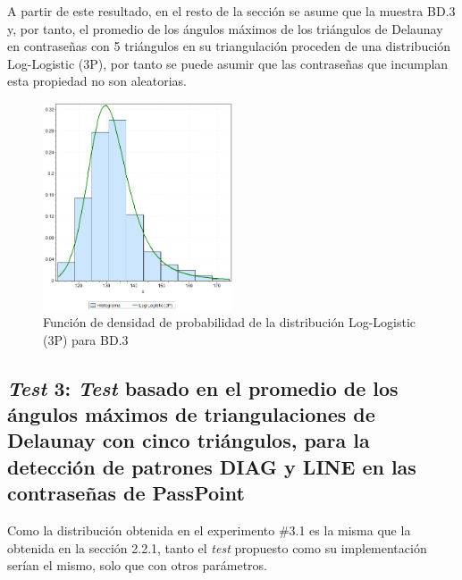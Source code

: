 \documentclass[12pt]{report}
\begin{document}
A partir de este resultado, en el resto de la sección se asume que la muestra  BD.3 y, por tanto, el promedio de los ángulos máximos de los triángulos de Delaunay en contraseñas con 5 triángulos en su triangulación  proceden de una distribución Log-Logistic (3P), por tanto se puede asumir que las contraseñas que incumplan esta propiedad no son aleatorias.
\begin{figure}[ht]
	\centering
	
	\includegraphics[width=0.5\textwidth]{5td_fdp.png}
	\caption{Función de densidad de probabilidad de la  distribución Log-Logistic (3P) para BD.3}
	\label{5TD_FDP}
\end{figure}

\newpage
\subsection{\textit{Test} 3: \textit{Test} basado en el promedio de los ángulos máximos de triangulaciones de Delaunay con cinco triángulos, para la detección de patrones DIAG y LINE en las contraseñas de PassPoint}
\label{sec:3.2}

Como la distribución   obtenida en el experimento \#3.1 es la misma que la obtenida en la sección 2.2.1, tanto el \textit{test} propuesto como su implementación  serían el mismo, solo que con otros parámetros.

\end{document}
